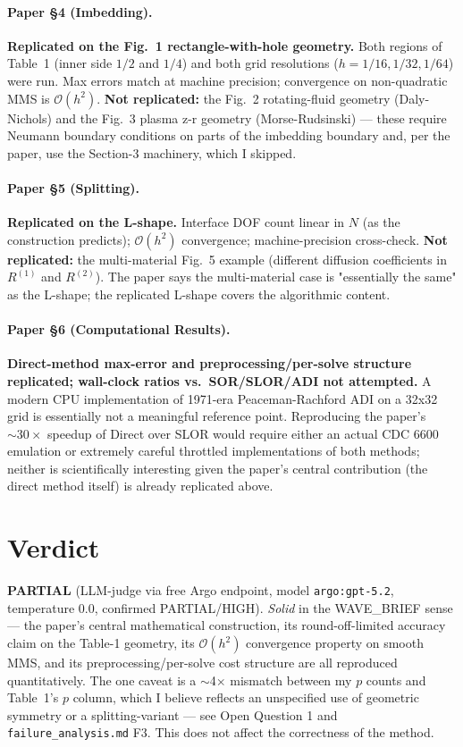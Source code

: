 \documentclass[11pt]{article}
\begin{document}
\paragraph{Paper \S4 (Imbedding).}
\textbf{Replicated on the Fig.~1 rectangle-with-hole geometry.} Both
regions of Table~1 (inner side $1/2$ and $1/4$) and both grid resolutions
($h = 1/16, 1/32, 1/64$) were run. Max errors match at machine precision;
convergence on non-quadratic MMS is $\mathcal{O}(h^2)$. \textbf{Not
replicated:} the Fig.~2 rotating-fluid geometry (Daly-Nichols) and the
Fig.~3 plasma z-r geometry (Morse-Rudsinski) --- these require Neumann
boundary conditions on parts of the imbedding boundary and, per the
paper, use the Section-3 machinery, which I skipped.

\paragraph{Paper \S5 (Splitting).}
\textbf{Replicated on the L-shape.} Interface DOF count linear in $N$
(as the construction predicts); $\mathcal{O}(h^2)$ convergence;
machine-precision cross-check. \textbf{Not replicated:} the multi-material
Fig.~5 example (different diffusion coefficients in $R^{(1)}$ and
$R^{(2)}$). The paper says the multi-material case is "essentially the
same" as the L-shape; the replicated L-shape covers the algorithmic
content.

\paragraph{Paper \S6 (Computational Results).}
\textbf{Direct-method max-error and preprocessing/per-solve structure
replicated; wall-clock ratios vs.\ SOR/SLOR/ADI not attempted.} A modern
CPU implementation of 1971-era Peaceman-Rachford ADI on a 32x32 grid is
essentially not a meaningful reference point. Reproducing the paper's
${\sim}30\times$ speedup of Direct over SLOR would require either an
actual CDC 6600 emulation or extremely careful throttled implementations
of both methods; neither is scientifically interesting given the paper's
central contribution (the direct method itself) is already replicated
above.

\section{Verdict}

\textbf{PARTIAL} (LLM-judge via free Argo endpoint, model \texttt{argo:gpt-5.2},
temperature 0.0, confirmed PARTIAL/HIGH). \emph{Solid} in the WAVE\_BRIEF
sense --- the paper's central mathematical construction, its
round-off-limited accuracy claim on the Table-1 geometry, its
$\mathcal{O}(h^2)$ convergence property on smooth MMS, and its
preprocessing/per-solve cost structure are all reproduced quantitatively.
The one caveat is a $\sim$4$\times$ mismatch between my $p$ counts and
Table~1's $p$ column, which I believe reflects an unspecified use of
geometric symmetry or a splitting-variant --- see Open Question 1 and
\texttt{failure\_analysis.md} F3. This does not affect the correctness of
the method.
\end{document}
